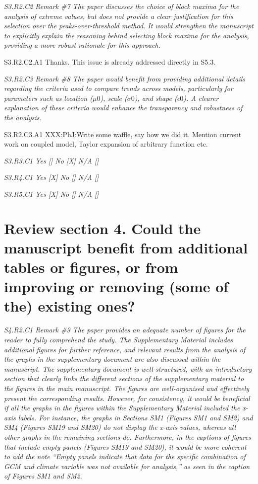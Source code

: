 \documentclass[a4paper,10pt]{article}
\begin{document}
	\emph{S3.R2.C2 Remark \#7 The paper discusses the choice of block maxima for the analysis of extreme values, but does not provide a clear justification for this selection over the peaks-over-threshold method. It would strengthen the manuscript to explicitly explain the reasoning behind selecting block maxima for the analysis, providing a more robust rationale for this approach.}
	
	S3.R2.C2.A1 Thanks. This issue is already addressed directly in S5.3.
	
	\emph{S3.R2.C3 Remark \#8 The paper would benefit from providing additional details regarding the criteria used to compare trends across models, particularly for parameters such as location ($\mu0$), scale ($\sigma0$), and shape ($\epsilon0$). A clearer explanation of these criteria would enhance the transparency and robustness of the analysis.}
	
	S3.R2.C3.A1 XXX:PhJ:Write some waffle, say how we did it. Mention current work on coupled model, Taylor expansion of arbitrary function etc.
	
	\emph{S3.R3.C1 Yes [] No [X] N/A []}
	
	\emph{S3.R4.C1 Yes [X] No [] N/A []}
	
	\emph{S3.R5.C1 Yes [X] No [] N/A []}

	\section*{Review section 4. Could the manuscript benefit from additional tables or figures, or from improving or removing (some of the) existing ones?}

	\emph{S4.R2.C1 Remark \#9 The paper provides an adequate number of figures for the reader to fully comprehend the study. The Supplementary Material includes additional figures for further reference, and relevant results from the analysis of the graphs in the supplementary document are also discussed within the manuscript. The supplementary document is well-structured, with an introductory section that clearly links the different sections of the supplementary material to the figures in the main manuscript. The figures are well-organised and effectively present the corresponding results. However, for consistency, it would be beneficial if all the graphs in the figures within the Supplementary Material included the x-axis labels. For instance, the graphs in Sections SM1 (Figures SM1 and SM2) and SM4 (Figures SM19 and SM20) do not display the x-axis values, whereas all other graphs in the remaining sections do. Furthermore, in the captions of figures that include empty panels (Figures SM19 and SM20), it would be more coherent to add the note “Empty panels indicate that data for the specific combination of GCM and climate variable was not available for analysis,” as seen in the caption of Figures SM1 and SM2.}
\end{document}
